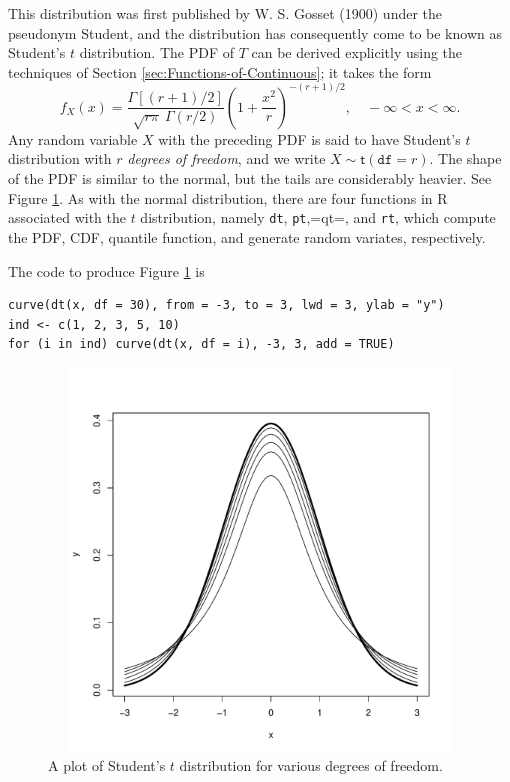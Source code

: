 \documentclass[captions=tableheading]{scrbook}
\begin{document}
This distribution was first published by W. S. Gosset (1900) under the pseudonym Student, and the distribution has consequently come to be known as Student's \(t\) distribution. The PDF of \(T\) can be derived explicitly using the techniques of Section \ref{sec:Functions-of-Continuous}; it takes the form 
\begin{equation}
f_{X}(x)=\frac{\Gamma[(r+1)/2]}{\sqrt{r\pi}\ \Gamma(r/2)}\left(1+\frac{x^{2}}{r}\right)^{-(r+1)/2},\quad-\infty<x<\infty.
\end{equation}
Any random variable \(X\) with the preceding PDF is said to have Student's \(t\) distribution with \(r\) \emph{degrees of freedom}, and we write \(X\sim\mathsf{t}(\mathtt{df}=r)\). The shape of the PDF is similar to the normal, but the tails are considerably heavier. See Figure \ref{fig:Student's-t-dist-vary-df}. As with the normal distribution, there are four functions in \textsf{R} associated with the \(t\) distribution, namely \texttt{dt}, \texttt{pt},=qt=, and \texttt{rt}, which compute the PDF, CDF, quantile function, and generate random variates, respectively.


The code to produce Figure \ref{fig:Student's-t-dist-vary-df} is

\begin{verbatim}
curve(dt(x, df = 30), from = -3, to = 3, lwd = 3, ylab = "y")
ind <- c(1, 2, 3, 5, 10)
for (i in ind) curve(dt(x, df = i), -3, 3, add = TRUE)
\end{verbatim}



\begin{figure}[th]
    \includegraphics[width=5in, height=4in]{img/Student's-t-dist-vary-df.pdf}
    \caption[Student's \(t\) distribution for various degrees of freedom]{\small A plot of Student's \(t\) distribution for various degrees of freedom.}
    \label{fig:Student's-t-dist-vary-df}
  \end{figure}
\end{document}
